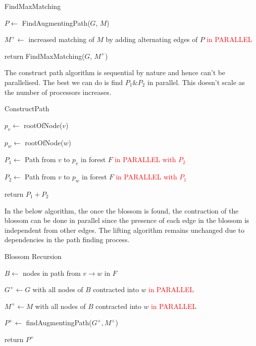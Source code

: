 \begin{algorithm}[H]
\SetAlgoLined
\caption{FindMaxMatching}

$P \leftarrow$ FindAugmentingPath($G$, $M$)


$M^+ \leftarrow$ increased matching of $M$ by adding alternating edges of $P$ \textcolor{red}{in PARALLEL}

return FindMaxMatching($G$, $M^+$)
\end{algorithm}

The construct path algorithm is sequential by nature and hence can't be parallelised. The best we can do is find $P_1 \& P_2$ in parallel. This doesn't scale as the number of processors increases.

\begin{algorithm}[!h]
\caption{ConstructPath}

$p_v \leftarrow$ rootOfNode($v$)

$p_w \leftarrow$ rootOfNode($w$)

$P_1 \leftarrow$ Path from $v$ to $p_v$ in forest $F$ \textcolor{red}{in PARALLEL with $P_2$}

$P_2 \leftarrow$ Path from $v$ to $p_w$ in forest $F$ \textcolor{red}{in PARALLEL with $P_1$}

return $P_1 + P_2$
\end{algorithm}

In the below algorithm, the once the blossom is found, the contraction of the blossom can be done in parallel since the presence of each edge in the blossom is independent from other edges. The lifting algorithm remains unchanged due to dependencies in the path finding process.

\begin{algorithm}[!h]
\caption{Blossom Recursion}

$B \leftarrow$ nodes in path from $v \to w$ in $F$

$G^+ \leftarrow G$ with all nodes of $B$ contracted into $w$ \textcolor{red}{in PARALLEL}

$M^+ \leftarrow M$ with all nodes of $B$ contracted into $w$ \textcolor{red}{in PARALLEL}

$P^+ \leftarrow$ findAugmentingPath($G^+, M^+$)


return $P^+$
\end{algorithm}

